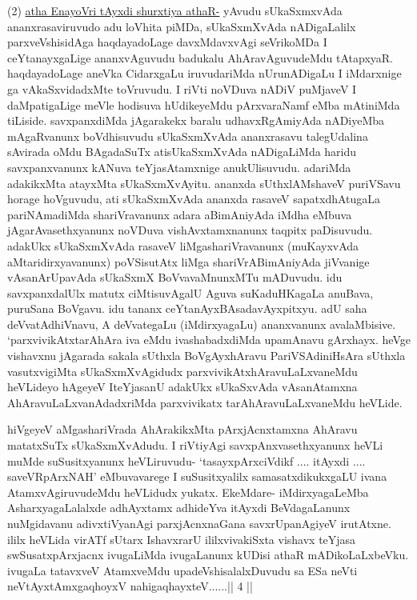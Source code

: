 \begin{artha}
(2) \underline{atha EnayoVri tAyxdi shurxtiya athaR-} yAvudu sUkaSxmxvAda ananxrasaviruvudo adu loVhita piMDa, sUkaSxmXvAda nADigaLalilx parxveVshisidAga haqdayadoLage davxMdavxvAgi seVrikoMDa I ceYtanayxgaLige ananxvAguvudu badukalu AhAravAguvudeMdu tAtapxyaR. haqdayadoLage aneVka CidarxgaLu iruvudariMda nUrunADigaLu I iMdarxnige ga vAkaSxvidadxMte toVruvudu. I riVti noVDuva nADiV puMjaveV I daMpatigaLige meVle hodisuva hUdikeyeMdu pArxvaraNamf eMba mAtiniMda tiLiside. savxpanxdiMda jAgarakekx baralu udhavxRgAmiyAda nADiyeMba mAgaRvanunx boVdhisuvudu sUkaSxmXvAda ananxrasavu talegUdalina sAvirada oMdu BAgadaSuTx atisUkaSxmXvAda nADigaLiMda haridu savxpanxvanunx kANuva teYjasAtamxnige anukUlisuvudu. adariMda adakikxMta atayxMta sUkaSxmXvAyitu. ananxda sUthxlAMshaveV puriVSavu horage hoVguvudu, ati sUkaSxmXvAda ananxda rasaveV sapatxdhAtugaLa pariNAmadiMda shariVravanunx adara aBimAniyAda iMdha eMbuva jAgarAvasethxyanunx noVDuva vishAvxtamxnanunx taqpitx paDisuvudu. adakUkx sUkaSxmXvAda rasaveV liMgashariVravanunx (muKayxvAda aMtaridirxyavanunx) poVSisutAtx liMga shariVrABimAniyAda jiVvanige vAsanArUpavAda sUkaSxmX BoVvavaMnunxMTu mADuvudu. idu savxpanxdalUlx matutx ciMtisuvAgalU Aguva suKaduHKagaLa anuBava, puruSana BoVgavu. idu tananx ceYtanAyxBAsadavAyxpitxyu. adU saha deVvatAdhiVnavu, A deVvategaLu (iMdirxyagaLu) ananxvanunx avalaMbisive. `parxvivikAtxtarAhAra iva eMdu ivashabadxdiMda upamAnavu gArxhayx. heVge vishavxnu jAgarada sakala sUthxla BoVgAyxhAravu PariVSAdiniHsAra sUthxla vasutxvigiMta sUkaSxmXvAgidudx parxvivikAtxhAravuLaLxvaneMdu heVLideyo hAgeyeV IteYjasanU adakUkx sUkaSxvAda vAsanAtamxna AhAravuLaLxvanAdadxriMda parxvivikatx tarAhAravuLaLxvaneMdu heVLide.
\end{artha}

\begin{artha}
hiVgeyeV aMgashariVrada AhArakikxMta pArxjAcnxtamxna AhAravu matatxSuTx sUkaSxmXvAdudu. I riVtiyAgi savxpAnxvasethxyanunx heVLi muMde suSusitxyanunx heVLiruvudu- `tasayxpArxciVdikf .... itAyxdi .... saveVRpArxNAH' eMbuvavarege I suSusitxyalilx samasatxdikukxgaLU ivana AtamxvAgiruvudeMdu heVLidudx yukatx. EkeMdare- iMdirxyagaLeMba AsharxyagaLalalxde adhAyxtamx adhideYva itAyxdi BeVdagaLanunx nuMgidavanu adivxtiVyanAgi parxjAcnxnaGana savxrUpanAgiyeV irutAtxne. ililx heVLida virATf sUtarx IshavxrarU ililxvivakiSxta vishavx teYjasa swSusatxpArxjacnx ivugaLiMda ivugaLanunx kUDisi athaR mADikoLaLxbeVku. ivugaLa tatavxveV AtamxveMdu upadeVshisalalxDuvudu sa ESa neVti neVtAyxtAmx\s gaqhoyxV nahigaqhayxteV......|| 4 || 
\end{artha}

